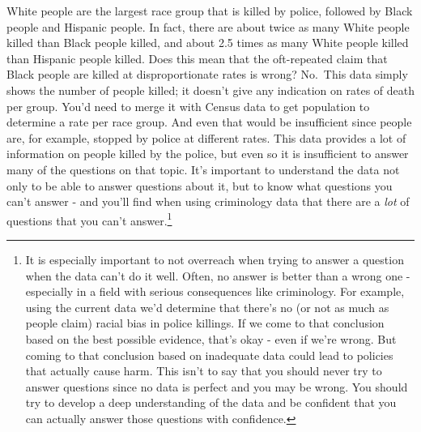 \documentclass[
  12pt,
]{book}
\newenvironment{Shaded}{\begin{snugshade}}{\end{snugshade}}
\newcommand{\CommentTok}[1]{\textcolor[rgb]{0.37,0.37,0.37}{\textit{#1}}}
\newcommand{\DataTypeTok}[1]{\textcolor[rgb]{0.27,0.27,0.27}{#1}}
\newcommand{\DecValTok}[1]{\textcolor[rgb]{0.06,0.06,0.06}{#1}}
\newcommand{\KeywordTok}[1]{\textcolor[rgb]{0.27,0.27,0.27}{\textbf{#1}}}
\newcommand{\NormalTok}[1]{#1}
\newcommand{\OperatorTok}[1]{\textcolor[rgb]{0.43,0.43,0.43}{\textbf{#1}}}
\newcommand{\StringTok}[1]{\textcolor[rgb]{0.5,0.5,0.5}{#1}}
\begin{document}
\begin{Shaded}
\end{Shaded}

White people are the largest race group that is killed by police, followed by Black people and Hispanic people. In fact, there are about twice as many White people killed than Black people killed, and about 2.5 times as many White people killed than Hispanic people killed. Does this mean that the oft-repeated claim that Black people are killed at disproportionate rates is wrong? No.~This data simply shows the number of people killed; it doesn't give any indication on rates of death per group. You'd need to merge it with Census data to get population to determine a rate per race group. And even that would be insufficient since people are, for example, stopped by police at different rates. This data provides a lot of information on people killed by the police, but even so it is insufficient to answer many of the questions on that topic. It's important to understand the data not only to be able to answer questions about it, but to know what questions you can't answer - and you'll find when using criminology data that there are a \emph{lot} of questions that you can't answer.\footnote{It is especially important to not overreach when trying to answer a question when the data can't do it well. Often, no answer is better than a wrong one - especially in a field with serious consequences like criminology. For example, using the current data we'd determine that there's no (or not as much as people claim) racial bias in police killings. If we come to that conclusion based on the best possible evidence, that's okay - even if we're wrong. But coming to that conclusion based on inadequate data could lead to policies that actually cause harm. This isn't to say that you should never try to answer questions since no data is perfect and you may be wrong. You should try to develop a deep understanding of the data and be confident that you can actually answer those questions with confidence.}
\end{document}
